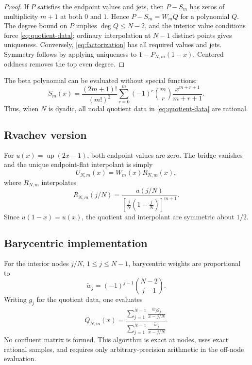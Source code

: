 \documentclass[11pt,oneside]{article}
\numberwithin{equation}{section}
\theoremstyle{definition}
\theoremstyle{remark}
\newcommand{\upf}{\operatorname{up}}
\begin{document}
\begin{proof}
If $P$ satisfies the endpoint values and jets, then $P-S_m$ has zeros of multiplicity
$m+1$ at both $0$ and $1$.  Hence $P-S_m=W_mQ$ for a polynomial $Q$.  The degree bound on
$P$ implies $\deg Q\le N-2$, and the interior value conditions force
\eqref{eq:quotient-data}; ordinary interpolation at $N-1$ distinct points gives uniqueness.
Conversely, \eqref{eq:factorization} has all required values and jets.  Symmetry follows by
applying uniqueness to $1-P_{N,m}(1-x)$.  Centered oddness removes the top even degree.
\end{proof}

The beta polynomial can be evaluated without special functions:
\begin{equation}
 S_m(x)=\frac{(2m+1)!}{(m!)^2}
 \sum_{r=0}^{m}(-1)^r\binom mr\frac{x^{m+r+1}}{m+r+1}.
 \label{eq:smoothstep-explicit}
\end{equation}
Thus, when $N$ is dyadic, all nodal quotient data in
\eqref{eq:quotient-data} are rational.

\subsection{Rvachev version}

For $u(x)=\upf(2x-1)$, both endpoint values are zero.  The bridge vanishes and the unique
endpoint-flat interpolant is simply
\begin{equation}
 U_{N,m}(x)=W_m(x)R_{N,m}(x),
 \label{eq:up-factorization}
\end{equation}
where $R_{N,m}$ interpolates
\begin{equation}
 R_{N,m}(j/N)=\frac{u(j/N)}{[\frac jN(1-\frac jN)]^{m+1}}.
 \label{eq:up-quotient}
\end{equation}
Since $u(1-x)=u(x)$, the quotient and interpolant are symmetric about $1/2$.

\subsection{Barycentric implementation}

For the interior nodes $j/N$, $1\le j\le N-1$, barycentric weights are proportional to
\begin{equation}
 \widetilde w_j=(-1)^{j-1}\binom{N-2}{j-1}.
 \label{eq:interior-weights}
\end{equation}
Writing $g_j$ for the quotient data, one evaluates
\begin{equation}
 Q_{N,m}(x)=
 \frac{\displaystyle\sum_{j=1}^{N-1}
       \frac{\widetilde w_jg_j}{x-j/N}}
      {\displaystyle\sum_{j=1}^{N-1}
       \frac{\widetilde w_j}{x-j/N}}.
 \label{eq:quotient-barycentric}
\end{equation}
No confluent matrix is formed.  This algorithm is exact at nodes, uses exact rational
samples, and requires only arbitrary-precision arithmetic in the off-node evaluation.
\end{document}
